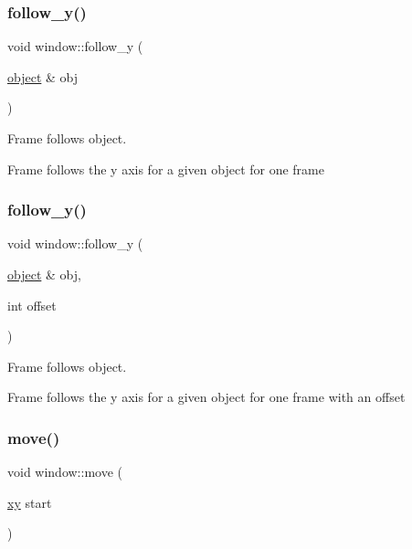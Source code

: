 \subsubsection{\texorpdfstring{follow\+\_\+y()}{follow\_y()}\hspace{0.1cm}{\footnotesize\ttfamily [1/2]}}
{\footnotesize\ttfamily void window\+::follow\+\_\+y (\begin{DoxyParamCaption}\item[{\hyperlink{classobject}{object} \&}]{obj }\end{DoxyParamCaption})}



Frame follows object. 

Frame follows the y axis for a given object for one frame \mbox{\label{classwindow_a64c6dd5f1f544282541532e17a26d1e7}} 
\subsubsection{\texorpdfstring{follow\+\_\+y()}{follow\_y()}\hspace{0.1cm}{\footnotesize\ttfamily [2/2]}}
{\footnotesize\ttfamily void window\+::follow\+\_\+y (\begin{DoxyParamCaption}\item[{\hyperlink{classobject}{object} \&}]{obj,  }\item[{int}]{offset }\end{DoxyParamCaption})}



Frame follows object. 

Frame follows the y axis for a given object for one frame with an offset \mbox{\label{classwindow_aa32da017b225e569e0e3ca6974505873}} 
\subsubsection{\texorpdfstring{move()}{move()}\hspace{0.1cm}{\footnotesize\ttfamily [1/2]}}
{\footnotesize\ttfamily void window\+::move (\begin{DoxyParamCaption}\item[{\hyperlink{classxy}{xy}}]{start }\end{DoxyParamCaption})}




